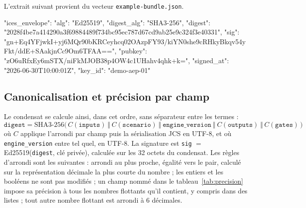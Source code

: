 \documentclass[11pt,a4paper]{article}
\begin{document}
L'extrait suivant provient du vecteur \texttt{example-bundle.json}.

\begin{code}
"ices_envelope": {
  "alg": "Ed25519",
  "digest_alg": "SHA3-256",
  "digest": "2028f4be7a414290a3f69884489f734bc95ec787d67cd9ab25e9c324f3e40331",
  "sig": "gn+Eq4YFjwkI+yj6MQr90bKRCeyhcq02OAzpFY93/kiYN0she9cRHkyBkqv54yFkt/ddE+SAakjnCc9Om6TFAA==",
  "pubkey": "zO6uRfxEy6mSTX/niFkMJOB38p4OW4c1UHahv4qhk+k=",
  "signed_at": "2026-06-30T10:00:01Z",
  "key_id": "demo-aep-01"
}
\end{code}

\subsection{Canonicalisation et précision par champ}\label{sec:spec-precision}

Le condensat se calcule ainsi, dans cet ordre, sans séparateur entre les termes :
\[
\texttt{digest} = \text{SHA3-256}\big(\,C(\texttt{inputs})\ \Vert\ C(\texttt{scenario})\ \Vert\ \texttt{engine\_version}\ \Vert\ C(\texttt{outputs})\ \Vert\ C(\texttt{gates})\,\big)
\]
où $C$ applique l'arrondi par champ puis la sérialisation JCS en UTF-8, et où \texttt{engine\_version} entre tel quel, en UTF-8. La signature est \texttt{sig} $=$ Ed25519(\texttt{digest}, clé privée), calculée sur les 32 octets du condensat. Les règles d'arrondi sont les suivantes : arrondi au plus proche, égalité vers le pair, calculé sur la représentation décimale la plus courte du nombre ; les entiers et les booléens ne sont pas modifiés ; un champ nommé dans le tableau~\ref{tab:precision} impose sa précision à tous les nombres flottants qu'il contient, y compris dans des listes ; tout autre nombre flottant est arrondi à 6 décimales.
\end{document}
